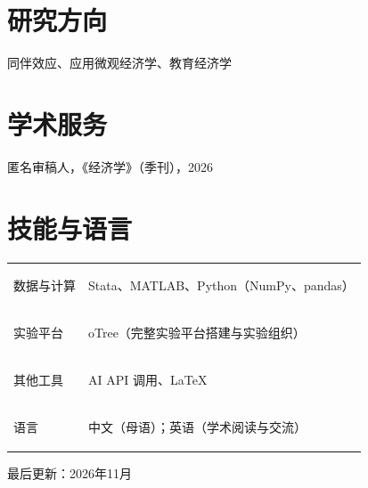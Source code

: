 \documentclass[10pt,a4paper,fontset=fandol]{ctexart}
\begin{document}
\section*{研究方向}
同伴效应、应用微观经济学、教育经济学

\section*{学术服务}
匿名审稿人，《经济学》（季刊），2026

\section*{技能与语言}
\begin{tabularx}{\textwidth}{@{}>{\bfseries\raggedright\arraybackslash}p{2.9cm}X@{}}
  数据与计算 & Stata、MATLAB、Python（NumPy、pandas）\\
  实验平台 & oTree（完整实验平台搭建与实验组织）\\
  其他工具 & AI API 调用、LaTeX \\
  语言 & 中文（母语）；英语（学术阅读与交流）
\end{tabularx}

\vfill
\begin{center}
  {\scriptsize\textcolor{Muted}{最后更新：2026年11月}}
\end{center}
\end{document}
